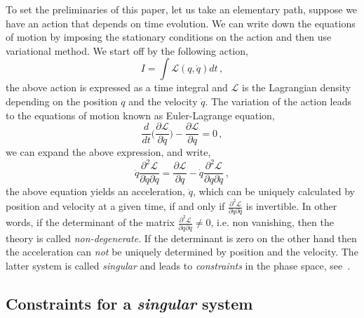 \documentclass[a4paper,12pt]{article}
\newcommand{\+}{^{\dagger}}
\newcommand{\2}{\frac{1}{2}}
\newcommand{\3}{\frac{1}{3}}
\newcommand{\4}{\frac{1}{4}}
\newcommand{\6}{\frac{1}{6}}
\newcommand{\8}{\frac{1}{8}}
\begin{document}
To set the preliminaries of this paper, let us take an elementary path, suppose we have an action that depends on time evolution. We can write down the equations of motion by imposing the stationary conditions on the action and then use variational method. We start off by the following action, 
\begin{equation}
I=\int \mathcal{L} (q,\dot{q})dt\,,
\end{equation}
the above action is expressed as a time integral and $\mathcal{L}$ is the Lagrangian density depending on the position $q$ and the velocity $\dot{q}$. The variation of the action leads to  the equations of motion known as Euler-Lagrange equation,
\begin{equation}
\frac{d}{dt}\bigg(\frac{\partial\mathcal{L}}{\partial\dot{q}}\bigg)-\frac{\partial\mathcal{L}}{\partial q}=0\,,
\end{equation}
we can expand the above expression, and write, 
\begin{equation}
\ddot{q}\frac{\partial^{2}\mathcal{L}}{\partial \dot{q}\partial \dot{q}}=\frac{\partial\mathcal{L}}{\partial
q}-\dot{q}\frac{\partial^{2}\mathcal{L}}{\partial q\partial \dot{q}}\,,
\end{equation}
the above equation yields an acceleration, $\ddot{q}$, which can be uniquely calculated by position and velocity at a given time,
if and only if $\frac{\partial^{2}\mathcal{L}}{\partial \dot{q}\partial \dot{q}}$ is invertible. In other words, if the determinant  of the matrix $\frac{\partial^{2}\mathcal{L}}{\partial\dot{q}\partial \dot{q}}\neq 0$, i.e. non vanishing, then the theory is called {\it non-degenerate}. If the determinant is zero on the other hand then the acceleration can \textit{not} be uniquely determined by position and the velocity. The latter system is called {\it singular} and leads to {\it constraints} in the phase space, see~\cite{Dirac1,Wipf:1993xg,Henneaux}.


\subsection{Constraints for a {\it singular} system}  
\end{document}
